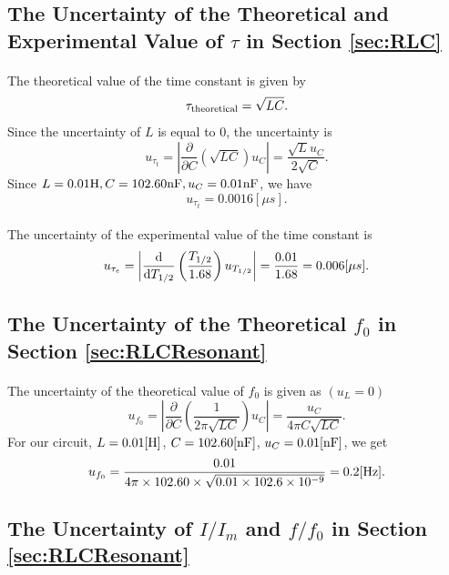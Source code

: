 \documentclass{my_template}
\renewcommand{\d}{{\rm d}}
\begin{document}
    \subsection{The Uncertainty of the Theoretical and Experimental Value of $\tau$ in Section \ref{sec:RLC}}
    \paragraph{} The theoretical value of the time constant is given by \[\tau_{\rm theoretical}=\sqrt{LC}.\] Since the uncertainty of $L$ is equal to 0, the uncertainty is \[u_{\tau_t}=\left|\frac{\partial}{\partial C}(\sqrt{LC})u_C\right|=\frac{\sqrt{L}u_C}{2\sqrt{C}}.\] Since $L=0.01{\rm H},C=102.60{\rm nF}, u_C=0.01{\rm nF}$, we have \[u_{\tau_t}=0.0016[\mu s].\]
    \vspace{-5mm}
    \paragraph{} The uncertainty of the experimental value of the time constant is $$u_{\tau_{e}}=\left|\frac{\d}{\d T_{1/2}}\left(\frac{T_{1/2}}{1.68}\right)u_{T_{1/2}}\right|=\frac{0.01}{1.68}=0.006[\mu s].$$
    \subsection{The Uncertainty of the Theoretical $f_0$ in Section \ref{sec:RLCResonant}}
    \paragraph{} The uncertainty of the theoretical value of $f_0$ is given as $(u_L=0)$ $$u_{f_0}=\left|\frac{\partial}{\partial C}\left(\frac{1}{2\pi\sqrt{LC}}\right)u_C\right|=\frac{u_C}{4\pi C\sqrt{LC}}.$$ For our circuit, $L=0.01[\rm H]$, $C=102.60[\rm nF]$, $u_C=0.01[\rm nF]$, we get \[u_{f_0}=\frac{0.01}{4\pi\times 102.60\times \sqrt{0.01\times 102.6\times 10^{-9}}}=0.2[\rm Hz].\]
    \subsection{The Uncertainty of $I/I_m$ and $f/f_0$ in Section \ref{sec:RLCResonant}}
\end{document}
